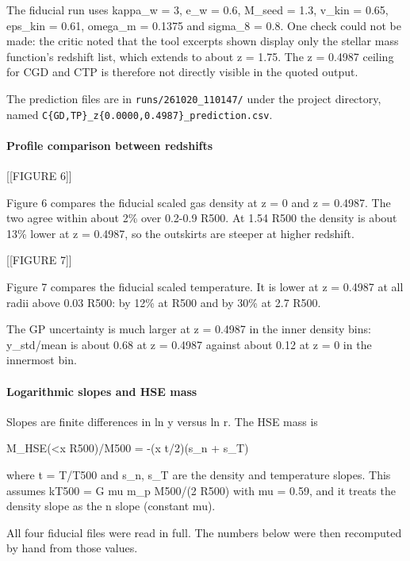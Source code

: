 \documentclass[11pt,a4paper]{article}
\begin{document}
The fiducial run uses kappa\_w = 3, e\_w = 0.6, M\_seed = 1.3, v\_kin = 0.65, eps\_kin = 0.61, omega\_m = 0.1375 and sigma\_8 = 0.8. One check could not be made: the critic noted that the tool excerpts shown display only the stellar mass function's redshift list, which extends to about z = 1.75. The z = 0.4987 ceiling for CGD and CTP is therefore not directly visible in the quoted output.

The prediction files are in \texttt{runs/\allowbreak{}261020\_\allowbreak{}110147/\allowbreak{}} under the project directory, named \texttt{C\{GD,\allowbreak{}TP\}\allowbreak{}\_\allowbreak{}z\{0.0000,\allowbreak{}0.4987\}\allowbreak{}\_\allowbreak{}prediction.csv}.

\paragraph{Profile comparison between redshifts}
[[FIGURE 6]]

Figure 6 compares the fiducial scaled gas density at z = 0 and z = 0.4987. The two agree within about 2\% over 0.2-0.9 R500. At 1.54 R500 the density is about 13\% lower at z = 0.4987, so the outskirts are steeper at higher redshift.

[[FIGURE 7]]

Figure 7 compares the fiducial scaled temperature. It is lower at z = 0.4987 at all radii above 0.03 R500: by 12\% at R500 and by 30\% at 2.7 R500.

The GP uncertainty is much larger at z = 0.4987 in the inner density bins: y\_std/mean is about 0.68 at z = 0.4987 against about 0.12 at z = 0 in the innermost bin.

\paragraph{Logarithmic slopes and HSE mass}
Slopes are finite differences in ln y versus ln r. The HSE mass is

M\_HSE(\textless{}x R500)/M500 = -(x t/2)(s\_n + s\_T)

where t = T/T500 and s\_n, s\_T are the density and temperature slopes. This assumes kT500 = G mu m\_p M500/(2 R500) with mu = 0.59, and it treats the density slope as the n slope (constant mu).

All four fiducial files were read in full. The numbers below were then recomputed by hand from those values.
\end{document}
